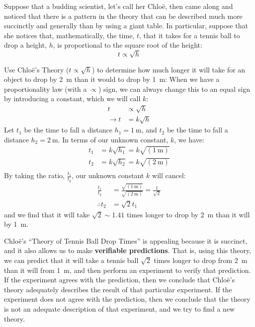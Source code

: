 Suppose that a budding scientist, let's call her Chlo\"e, then came along and noticed that there is a pattern in the theory that can be described much more succinctly and generally than by using a giant table. In particular, suppose that she notices that, mathematically, the time, $t$, that it takes for a tennis ball to drop a height, $h$, is proportional to the square root of the height:
\begin{equation*}
t \propto \sqrt{h}
\end{equation*}

\begin{example}{Use Chlo\"e's Theory ($t \propto \sqrt{h}$) to determine how much longer it will take for an object to drop by \SI{2}{\meter} than it would to drop by \SI{1}{\meter}:}
When we have a proportionality law (with a $\propto$) sign, we can always change this to an equal sign by introducing a constant, which we will call $k$:
\begin{align*}
t &\propto \sqrt{h} \\
\rightarrow t&=k\sqrt{h}
\end{align*}
Let $t_1$ be the time to fall a distance $h_1=\SI{1}{\meter}$, and $t_2$ be the time to fall a distance $h_2=\SI{2}{\meter}$. In terms of our unknown constant, $k$, we have:
\begin{align*}
t_1 &=k\sqrt{h_1}=k \sqrt{(\SI{1}{\meter})}\\
t_2 &=k\sqrt{h_2}=k \sqrt{(\SI{2}{\meter})}\\
\end{align*}
By taking the ratio, $\frac{t_1}{t_2}$, our unknown constant $k$ will cancel:
\begin{align*}
\frac{t_1}{t_2}&=\frac{\sqrt{(\SI{1}{\meter})}}{\sqrt{(\SI{2}{\meter})}}=\frac{1}{\sqrt 2}\\
\therefore t_2 &= \sqrt{2} t_1
\end{align*}
and we find that it will take $\sqrt{2}\sim 1.41$ times longer to drop by \SI{2}{\meter} than it will by \SI{1}{\meter}.
\end{example}

Chlo\"e's ``Theory of Tennis Ball Drop Times'' is appealing because it is succinct, and it also allows us to make \textbf{verifiable predictions}. That is, using this theory, we can predict that it will take a tennis ball $\sqrt 2$ times longer to drop from \SI{2}{\meter} than it will from \SI{1}{\meter}, and then perform an experiment to verify that prediction. If the experiment agrees with the prediction, then we conclude that Chlo\"e's theory adequately describes the result of that particular experiment. If the experiment does not agree with the prediction, then we conclude that the theory is not an adequate description of that experiment, and we try to find a new theory.

